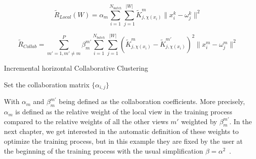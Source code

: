 		\begin{equation}
\label{criterion2}
		\widetilde{R}_{Local}(W) = \alpha_m\sum_{i=1}^{N_{batch}}\sum_{j=1}^{|W|}\widetilde{K}^m_{j, \chi(x_i)}\|x_i^k - \omega_j^k\|^2
		\end{equation}
		
		\begin{equation}
        \widetilde{R}_{Collab} = \sum_{m'=1, m'\neq m}^{P}\beta_m^{m'}\sum_{i=1}^{N_{batch}}\sum_{j=1}^{|W|}{(\widetilde{K}^m_{j, \chi(x_i)} - \widetilde{K}^{m'}_{j, \chi(x_i)})}^2  \|x_i^m - \omega_j^m\|^2
		\end{equation}
		
		\begin{algorithm}[H]
			\caption{Incremental horizontal Collaborative Clustering}
\label{alg1}
				Set the collaboration matrix $\{\alpha_{i,j}\}$\\
		\end{algorithm}
		
        With $\alpha_m$ and $\beta_m^{m'}$ being defined as the collaboration coefficients. More precisely, $\alpha_m$ is defined as the relative weight of the local view in the training process compared to the relative weights of all the other views $m'$ weighted by $\beta_m^{m'}$. In the next chapter, we get interested in the automatic definition of these weights to optimize the training process, but in this example they are fixed by the user at the beginning of the training process with the usual simplification $\beta = \alpha^2$~\cite{ghassany2012collaborative,rastin2015collaborative}.
	
